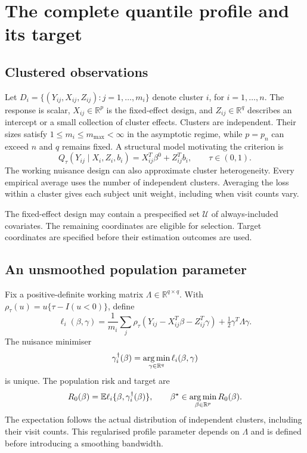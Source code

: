 \section{The complete quantile profile and its target}\label{sec:model}

\subsection{Clustered observations}\label{subsec:model}

Let $D_i=\{(Y_{ij},X_{ij},Z_{ij}):j=1,\ldots,m_i\}$ denote cluster
$i$, for $i=1,\ldots,n$. The response is scalar,
$X_{ij}\in\mathbb R^p$ is the fixed-effect design, and
$Z_{ij}\in\mathbb R^q$ describes an intercept or a small collection of
cluster effects. Clusters are independent. Their sizes satisfy
$1\leq m_i\leq m_{\max}<\infty$ in the asymptotic regime, while
$p=p_n$ can exceed $n$ and $q$ remains fixed. A structural model
motivating the criterion is
\begin{equation}\label{eq:structural-model}
 Q_\tau(Y_{ij}\mid X_i,Z_i,b_i)
       =X_{ij}^T\beta^0+Z_{ij}^Tb_i,\qquad \tau\in(0,1).
\end{equation}
The working nuisance design can also approximate cluster
heterogeneity. Every empirical average uses the number of independent
clusters. Averaging the loss within a cluster gives each subject unit
weight, including when visit counts vary.

The fixed-effect design may contain a prespecified set $\mathcal U$
of always-included covariates. The remaining coordinates are eligible
for selection. Target coordinates are specified before their
estimation outcomes are used.

\subsection{An unsmoothed population parameter}\label{subsec:target}

Fix a positive-definite working matrix $\Lambda\in\mathbb R^{q\times q}$.
With $\rho_\tau(u)=u\{\tau-I(u<0)\}$, define
\begin{equation}\label{eq:cluster-unsmoothed}
 \ell_i(\beta,\gamma)=\frac1{m_i}\sum_j
       \rho_\tau(Y_{ij}-X_{ij}^T\beta-Z_{ij}^T\gamma)
                    +\tfrac12\gamma^T\Lambda\gamma.
\end{equation}
The nuisance minimiser
\begin{equation}\label{eq:gamma-target}
 \gamma_i^\dagger(\beta)=\operatorname*{arg\,min}_{\gamma\in\mathbb R^q}
                              \ell_i(\beta,\gamma)
\end{equation}
is unique. The population risk and target are
\begin{equation}\label{eq:population-profile-risk}
 R_0(\beta)=\mathbb{E}\ell_i\{\beta,\gamma_i^\dagger(\beta)\},
 \qquad \beta^\star\in\operatorname*{arg\,min}_{\beta\in\mathbb R^p}R_0(\beta).
\end{equation}
The expectation follows the actual distribution of independent
clusters, including their visit counts. This regularised profile
parameter depends on $\Lambda$ and is defined before introducing a
smoothing bandwidth.


